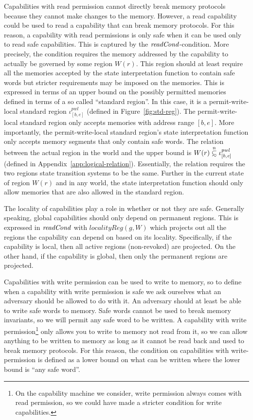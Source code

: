 \documentclass[format=acmsmall, review=true, screen=true]{acmart}
\renewcommand{\figurename}{Figure}
\newcommand\subsetsim{\mathrel{\ooalign{\raise.2ex\hbox{$\subset$}\cr
      \hidewidth\lower.8ex\hbox{\scalebox{0.9}{$\sim$}}\hidewidth\cr}}}
\newcommand{\nsubsim}[1][n]{\stackrel{\tiny{#1}}{\subsetsim}}
\newcommand{\var}[1]{\mathit{#1}}
\newcommand{\gl}{\var{g}}
\newcommand{\start}{\var{b}}
\newcommand{\addrend}{\var{e}}
\newcommand{\pwl}{\var{pwl}}
\newcommand{\plainfun}[2]{
  \ifthenelse{\equal{#2}{}}
  {\mathit{#1}}
  {\mathit{#1}(#2)}
}
\newcommand{\readCond}[1]{\plainfun{readCond}{#1}}
\newcommand{\tpwl}{permit-write-local standard region}
\begin{document}
Capabilities with read permission cannot directly break memory protocols because they cannot make changes to the memory.
However, a read capability could be used to read a capability that can break memory protocols.
For this reason, a capability with read permissions is only safe when it can be used only to read safe capabilities.
This is captured by the $\readCond{}$-condition. 
More precisely, the condition requires the memory addressed by the capability to actually be governed by some region $W(r)$.
This region should at least require all the memories accepted by the state interpretation function to contain safe words but stricter requirements may be imposed on the memories.
This is expressed in terms of an upper bound on the possibly permitted memories defined in terms of a so called ``standard region''.
In this case, it is a \tpwl{} $\iota^\pwl_{[\start,\addrend]}$ (defined in \figurename~\ref{fig:std-reg}). 
The \tpwl{} only accepts memories with address range $[\start,\addrend]$.
More importantly, the \tpwl{}'s state interpretation function only accepts memory segments that only contain safe words.
The relation between the actual region in the world and the upper bound is $W(r) \nsubsim[n] \iota^\pwl_{[\start,\addrend]}$ (defined in Appendix~\ref{app:logical-relation}).
Essentially, the relation requires the two regions state transition systems to be the same. Further in the current state of region $W(r)$ and in any world, the state interpretation function should only allow memories that are also allowed in the standard region.

The locality of capabilities play a role in whether or not they are safe.
Generally speaking, global capabilities should only depend on permanent regions.
This is expressed in $\readCond{}$ with $\var{localityReg}(\gl,W)$ which projects out all the regions the capability can depend on based on its locality.
Specifically, if the capability is local, then all active regions (non-revoked) are projected.
On the other hand, if the capability is global, then only the permanent regions are projected.

Capabilities with write permission can be used to write to memory, so to define when a capability with write permission is safe we ask ourselves what an adversary should be allowed to do with it.
An adversary should at least be able to write safe words to memory.
Safe words cannot be used to break memory invariants, so we will permit any safe word to be written.
A capability with write permission\footnote{On the capability machine we consider, write permission always comes with read permission, so we could have made a stricter condition for write capabilities.}
only allows you to write to memory not read from it, so we can allow anything to be written to memory as long as it cannot be read back and used to break memory protocols.
For this reason, the condition on capabilities with write-permission is defined as a lower bound on what can be written where the lower bound is ``any safe word''.
\end{document}
